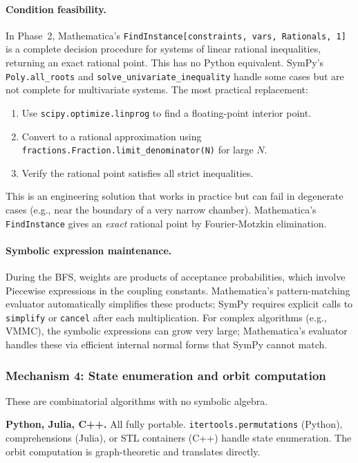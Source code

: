 \documentclass[12pt,a4paper]{article}
\theoremstyle{critical}
\theoremstyle{remark}
\theoremstyle{verified}
\begin{document}
\paragraph{Condition feasibility.}  In Phase~2, Mathematica's
\texttt{FindInstance[constraints, vars, Rationals, 1]} is a complete decision
procedure for systems of linear rational inequalities, returning an exact rational
point.  This has no Python equivalent.  SymPy's \texttt{Poly.all\_roots} and
\texttt{solve\_univariate\_inequality} handle some cases but are not complete for
multivariate systems.  The most practical replacement:
\begin{enumerate}
\item Use \texttt{scipy.optimize.linprog} to find a floating-point interior point.
\item Convert to a rational approximation using
  \texttt{fractions.Fraction.limit\_denominator(N)} for large $N$.
\item Verify the rational point satisfies all strict inequalities.
\end{enumerate}
This is an engineering solution that works in practice but can fail in degenerate
cases (e.g., near the boundary of a very narrow chamber).  Mathematica's
\texttt{FindInstance} gives an \emph{exact} rational point by Fourier-Motzkin
elimination.

\paragraph{Symbolic expression maintenance.}  During the BFS, weights are
products of acceptance probabilities, which involve Piecewise expressions in the
coupling constants.  Mathematica's pattern-matching evaluator automatically
simplifies these products; SymPy requires explicit calls to \texttt{simplify} or
\texttt{cancel} after each multiplication.  For complex algorithms (e.g., VMMC),
the symbolic expressions can grow very large; Mathematica's evaluator handles
these via efficient internal normal forms that SymPy cannot match.

\subsubsection{Mechanism 4: State enumeration and orbit computation}

These are combinatorial algorithms with no symbolic algebra.

\textbf{Python, Julia, C++.}  All fully portable.  \texttt{itertools.permutations}
(Python), comprehensions (Julia), or STL containers (C++) handle state
enumeration.  The orbit computation is graph-theoretic and translates directly.
\end{document}
